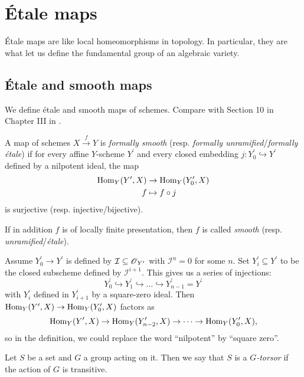 \documentclass[11pt, english]{article}
\begin{document}
\section{Étale maps}

Étale maps are like local homeomorphisms in topology. In particular, they are what let us define the fundamental group of an algebraic variety. 

\subsection{Étale and smooth maps}

We define étale and smooth maps of schemes.  Compare with Section 10 in Chapter III in \cite{hartshorne}.

\begin{defi}
A map of schemes $X \xrightarrow{f} Y$ is \emph{formally smooth} (resp. \emph{formally unramified}/\emph{formally étale}) if for every affine $Y$-scheme $Y^\prime$ and every closed embedding $j: Y_0^\prime \hookrightarrow Y^\prime$ defined by a nilpotent ideal, the map
\begin{align*}
\operatorname{Hom}_Y(Y^\prime, X) &\to \operatorname{Hom}_Y(Y_0^\prime , X) \\
f &\mapsto f \circ j
\end{align*}
is surjective (resp. injective/bijective).

If in addition $f$ is of locally finite presentation, then $f$ is called \emph{smooth} (resp. \emph{unramified}/\emph{étale}).
\end{defi}

\begin{remark}
Assume $Y_0^\prime \to Y^\prime$ is defined by $\mathcal I \subseteq \operatorname{\mathscr{O}}_{Y^\prime}$ with $\mathcal I^n=0$ for some $n$. Set $Y_i^\prime \subseteq Y^\prime$ to be the closed subscheme defined by $\mathcal I^{i+1}$. This gives us a series of injections:
\[
Y_0^\prime \hookrightarrow Y_1^\prime \hookrightarrow \dotsc \hookrightarrow Y_{n-1}^\prime = Y^\prime
\]
with $Y_i^\prime$ defined in $Y_{i+1}^\prime$ by a square-zero ideal. Then $\operatorname{Hom}_Y(Y^\prime,X) \to \operatorname{Hom}_Y(Y_0^\prime,X)$ factors as
\[
\operatorname{Hom}_Y(Y^\prime, X) \to \operatorname{Hom}_Y(Y^\prime_{n-2}, X) \to \cdots \to \operatorname{Hom}_Y(Y_0^\prime, X),
\]
so in the definition, we could replace the word ``nilpotent'' by ``square zero''.
\end{remark}

Let $S$ be a set and $G$ a group acting on it. Then we say that $S$ is a \emph{$G$-torsor} if the action of $G$ is transitive.
\end{document}
